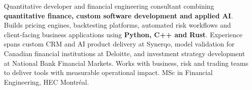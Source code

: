 
\begin{cvparagraph}

Quantitative developer and financial engineering consultant combining \textbf{quantitative finance, custom software development and applied AI}. Builds pricing engines, backtesting platforms, automated risk workflows and client-facing business applications using \textbf{Python, C++ and Rust}. Experience spans custom CRM and AI product delivery at Synerqo, model validation for Canadian financial institutions at Deloitte, and investment strategy development at National Bank Financial Markets. Works with business, risk and trading teams to deliver tools with measurable operational impact. MSc in Financial Engineering, HEC Montr\'eal.

\end{cvparagraph}

